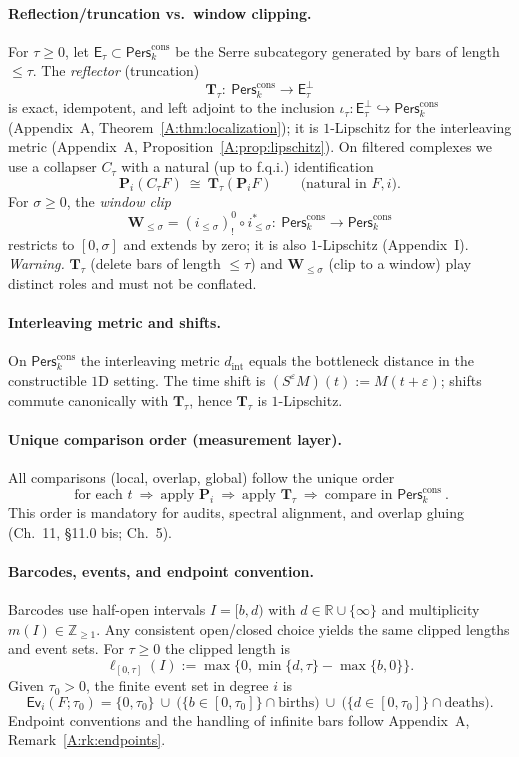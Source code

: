 \documentclass[11pt]{article}
\numberwithin{equation}{section}
\theoremstyle{plain}
\theoremstyle{definition}
\theoremstyle{remark}
\DeclareRobustCommand{\hyp}{\nobreakdash-}
\newcommand{\Pers}{\mathsf{Pers}}
\theoremstyle{plain}
\theoremstyle{definition}
\numberwithin{equation}{section}
\theoremstyle{definition}
\DeclareRobustCommand{\Perskft}{\Pers^{\mathrm{cons}}_{k}}
\numberwithin{equation}{section}
\theoremstyle{plain}
\theoremstyle{definition}
\theoremstyle{remark}
\begin{document}
\paragraph{Reflection/truncation vs.\ window clipping.}
For \(\tau\ge 0\), let \(\mathsf{E}_\tau\subset\Perskft\) be the Serre subcategory generated by bars of length \(\le \tau\).
The \emph{reflector} (truncation)
\[
\mathbf{T}_\tau:\ \Perskft\longrightarrow \mathsf{E}_\tau^\perp
\]
is exact, idempotent, and left adjoint to the inclusion \(\iota_\tau:\mathsf{E}_\tau^\perp\hookrightarrow\Perskft\) (Appendix~A, Theorem~\ref{A:thm:localization}); it is \(1\)\hyp Lipschitz for the interleaving metric (Appendix~A, Proposition~\ref{A:prop:lipschitz}).
On filtered complexes we use a collapser \(C_\tau\) with a natural (up to f.q.i.) identification
\[
\mathbf{P}_i(C_\tau F)\ \cong\ \mathbf{T}_\tau(\mathbf{P}_iF)\qquad\text{(natural in \(F,i\)).}
\]
For \(\sigma\ge 0\), the \emph{window clip}
\[
\mathbf{W}_{\le\sigma}=(i_{\le\sigma})^0_!\circ i_{\le\sigma}^\ast:\ \Perskft\to\Perskft
\]
restricts to \([0,\sigma]\) and extends by zero; it is also \(1\)\hyp Lipschitz (Appendix~I).
\emph{Warning.} \(\mathbf{T}_\tau\) (delete bars of length \(\le\tau\)) and \(\mathbf{W}_{\le\sigma}\) (clip to a window) play distinct roles and must not be conflated.

\paragraph{Interleaving metric and shifts.}
On \(\Perskft\) the interleaving metric \(d_{\mathrm{int}}\) equals the bottleneck distance in the constructible \(1\)D setting.
The time shift is \((S^\varepsilon M)(t):=M(t+\varepsilon)\); shifts commute canonically with \(\mathbf{T}_\tau\), hence \(\mathbf{T}_\tau\) is \(1\)\hyp Lipschitz.

\paragraph{Unique comparison order (measurement layer).}
All comparisons (local, overlap, global) follow the unique order
\[
\boxed{\ \text{for each } t\ \Longrightarrow\ \text{apply } \mathbf{P}_i \ \Longrightarrow\ \text{apply } \mathbf{T}_\tau \ \Longrightarrow\ \text{compare in }\Perskft\ }.
\]
This order is mandatory for audits, spectral alignment, and overlap gluing (Ch.~11, \S11.0 bis; Ch.~5).

\paragraph{Barcodes, events, and endpoint convention.}
Barcodes use half\hyp open intervals \(I=[b,d)\) with \(d\in\mathbb{R}\cup\{\infty\}\) and multiplicity \(m(I)\in\mathbb{Z}_{\ge1}\).
Any consistent open/closed choice yields the same clipped lengths and event sets.
For \(\tau\ge 0\) the clipped length is
\[
\ell_{[0,\tau]}(I):=\max\{0,\min\{d,\tau\}-\max\{b,0\}\}.
\]
Given \(\tau_0>0\), the finite event set in degree \(i\) is
\[
\mathsf{Ev}_i(F;\tau_0)=\{0,\tau_0\}\ \cup\ \bigl(\{b\in[0,\tau_0]\}\cap\mathrm{births}\bigr)\ \cup\ \bigl(\{d\in[0,\tau_0]\}\cap\mathrm{deaths}\bigr).
\]
Endpoint conventions and the handling of infinite bars follow Appendix~A, Remark~\ref{A:rk:endpoints}.
\end{document}
